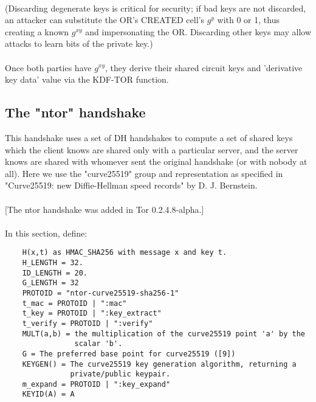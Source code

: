 \paragraph{}
(Discarding degenerate keys is critical for security; if bad keys
are not discarded, an attacker can substitute the OR's CREATED
cell's $g^y$ with 0 or 1, thus creating a known $g^{xy}$ and impersonating
the OR. Discarding other keys may allow attacks to learn bits of
the private key.)

\paragraph{}
Once both parties have $g^{xy}$, they derive their shared circuit keys
and 'derivative key data' value via the KDF-TOR function.

\subsection{The "ntor" handshake}
This handshake uses a set of DH handshakes to compute a set of
shared keys which the client knows are shared only with a particular
server, and the server knows are shared with whomever sent the
original handshake (or with nobody at all). Here we use the
"curve25519" group and representation as specified in "Curve25519:
new Diffie-Hellman speed records" by D. J. Bernstein.

\paragraph{}
[The ntor handshake was added in Tor 0.2.4.8-alpha.]

\paragraph{}
In this section, define:

\begin{verbatim}
    H(x,t) as HMAC_SHA256 with message x and key t.
    H_LENGTH = 32.
    ID_LENGTH = 20.
    G_LENGTH = 32
    PROTOID = "ntor-curve25519-sha256-1"
    t_mac = PROTOID | ":mac"
    t_key = PROTOID | ":key_extract"
    t_verify = PROTOID | ":verify"
    MULT(a,b) = the multiplication of the curve25519 point 'a' by the
                scalar 'b'.
    G = The preferred base point for curve25519 ([9])
    KEYGEN() = The curve25519 key generation algorithm, returning a
               private/public keypair.
    m_expand = PROTOID | ":key_expand"
    KEYID(A) = A
\end{verbatim}


